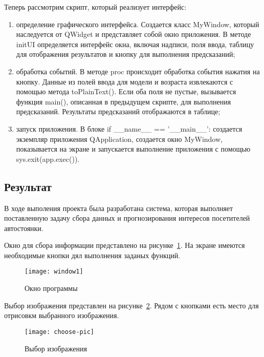 Теперь рассмотрим скрипт, который реализует интерфейс:
\begin{enumerate}
    \item определение графического интерфейса. Создается класс MyWindow, который наследуется от QWidget и представляет собой окно приложения. В методе initUI определяется интерфейс окна, включая надписи, поля ввода, таблицу для отображения результатов и кнопку для выполнения предсказаний;
    \item обработка событий. В методе proc происходит обработка события нажатия на кнопку. Данные из полей ввода для модели и возраста извлекаются с помощью метода toPlainText(). Если оба поля не пустые, вызывается функция main(), описанная в предыдущем скрипте, для выполнения предсказаний. Результаты предсказаний отображаются в таблице;
    \item запуск приложения. В блоке if \_\_name\_\_ == '\_\_main\_\_': создается экземпляр приложения QApplication, создается окно MyWindow, показывается на экране и запускается выполнение приложения с помощью sys.exit(app.exec()).
\end{enumerate}


\subsection{Результат}


В ходе выполения проекта была разработана система, которая выполняет поставленную задачу сбора данных и прогнозирования интересов посетителей автостоянки.


Окно для сбора информации представлено на рисунке~\ref{f:window1}. На экране имеются необходимые кнопки дял выполнения заданых функций.

\begin{figure}[h!]
	\centering
	\vspace{\toppaddingoffigure}
	\texttt{[image: window1]}
	\caption{Окно программы}
	\label{f:window1}
\end{figure}

Выбор изображения представлен на рисунке~\ref{f:choose-pic}. Рядом с кнопками есть место для отрисовкм выбранного изображения.

\begin{figure}[h!]
	\centering
	\vspace{\toppaddingoffigure}
	\texttt{[image: choose-pic]}
	\caption{Выбор изображения}
	\label{f:choose-pic}
\end{figure}

